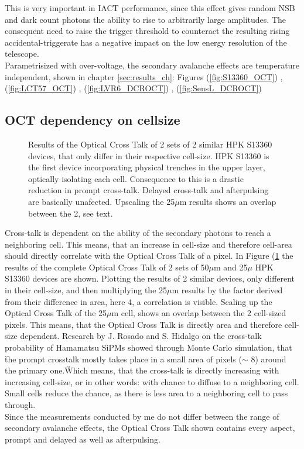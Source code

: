 \documentclass[12pt,article,type=msc,colorback,accentcolor=tud9c]{tudthesis}
\begin{document}
This is very important in IACT performance, since this effect gives random NSB and dark count photons the ability to rise to arbitrarily large amplitudes. The consequent need to raise the trigger threshold to counteract the resulting rising accidental-triggerate has a negative impact on the low energy resolution of the telescope.\\
Parametrisized with over-voltage, the secondary avalanche effects are temperature independent, shown in chapter {\ref{sec:results_ch}}: Figures (\ref{fig:S13360_OCT}) , (\ref{fig:LCT57_OCT}) , (\ref{fig:LVR6_DCROCT}) , (\ref{fig:SensL_DCROCT})\\

\subsection{OCT dependency on cellsize}
\begin{figure}[h]
\begin{centering}
\caption{Results of the Optical Cross Talk of 2 sets of 2 similar HPK S13360 devices, that only differ in their respective cell-size. HPK S13360 is the first device incorporating physical trenches in the upper layer, optically isolating each cell. Consequence to this is a drastic reduction in prompt cross-talk. Delayed cross-talk and afterpulsing are basically unafected. Upscaling the 25$\mu$m results shows an overlap between the 2, see text.}
\label{fig:cell-size}
\end{centering}
\end{figure}
Cross-talk is dependent on the ability of the secondary photons to reach a neighboring cell. This means, that an increase in cell-size and therefore cell-area should directly correlate with the Optical Cross Talk of a pixel. In Figure (\ref{fig:cell-size} the results of the complete Optical Cross Talk of 2 sets of 50$\mu$m and 25$\mu$ HPK S13360 devices are shown. Plotting the results of 2 similar devices, only different in their cell-size, and then multiplying the 25$\mu$m results by the factor derived from their difference in area, here 4, a correlation is visible. Scaling up the Optical Cross Talk of the 25$\mu$m cell, shows an overlap between the 2 cell-sized pixels. This means, that the Optical Cross Talk is directly area and therefore cell-size dependent. Research by J. Rosado and S. Hidalgo \cite{ModelCTAP} on the cross-talk probability of Hamamatsu SiPMs showed through Monte Carlo simulation, that \"the prompt crosstalk mostly takes place in a small area of pixels ($\sim$ 8) around the primary one.\" Which means, that the cross-talk is directly increasing with increasing cell-size, or in other words: with chance to diffuse to a neighboring cell. Small cells reduce the chance, as there is less area to a neighboring cell to pass through.\\
Since the measurements conducted by me do not differ between the range of secondary avalanche effects, the Optical Cross Talk shown contains every aspect, prompt and delayed as well as afterpulsing.
\end{document}

